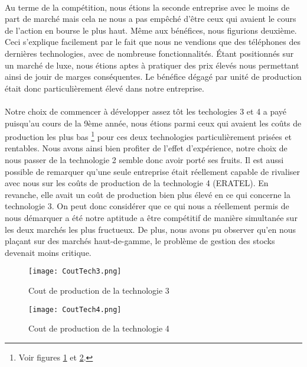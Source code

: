 \paragraph{}
Au terme de la compétition, nous étions la seconde entreprise avec le moins de
part de marché mais cela ne nous a pas empêché d'être ceux qui avaient le
cours de l'action en bourse le plus haut. Même aux bénéfices, nous figurions
deuxième. Ceci s'explique facilement par le fait que nous ne vendions que des
téléphones des dernières technologies, avec de nombreuse fonctionnalités.
Étant positionnés sur un marché de luxe, nous étions aptes à pratiquer des
prix élevés nous permettant ainsi de jouir de marges conséquentes. Le bénéfice
dégagé par unité de production était donc particulièrement élevé dans notre
entreprise.

\paragraph{}
Notre choix de commencer à développer assez tôt les techologies 3 et 4 a payé
puisqu'au cours de la 9ème année, nous étions parmi ceux qui avaient les coûts
de production les plus bas
\footnote{Voir figures \ref{coutTech3} et \ref{coutTech4}.}
pour ces deux technologies particulièrement prisées et rentables. Nous avons
ainsi bien profiter de l'effet d'expérience, notre choix de nous passer de la
technologie 2 semble donc avoir porté ses fruits. Il est aussi possible de
remarquer qu'une seule entreprise était réellement capable de rivaliser avec
nous sur les coûts de production de la technologie 4 (ERATEL). En revanche,
elle avait un coût de production bien plus élevé en ce qui concerne la
technologie 3. On peut donc considérer que ce qui nous a réellement permis de
nous démarquer a été notre aptitude a être compétitif de manière simultanée
sur les deux marchés les plus fructueux. De plus, nous avons pu observer qu'en
nous plaçant sur des marchés haut-de-gamme, le problème de gestion des stocks
devenait moins critique.

\begin{figure}
  \caption{\label{coutTech3}Cout de production de la technologie 3}
  \centering
  \texttt{[image: CoutTech3.png]}
\end{figure}

\begin{figure}
  \caption{\label{coutTech4}Cout de production de la technologie 4}
  \centering
  \texttt{[image: CoutTech4.png]}
\end{figure}
